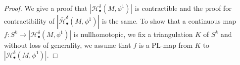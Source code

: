 \documentclass[a4paper]{amsart}
\theoremstyle{definition}
\theoremstyle{remark}
\numberwithin{equation}{section}
\begin{document}
\begin{proof}
We give a proof that $|\mathcal{H}_{\bullet}^{\delta}(M,\phi^1)|$ is  contractible and the proof for contractibility of $|\overline{\mathcal{H}}^{\delta}_{\bullet}(M,\phi^1)|$ is the same. To show that a continuous map $f:S^k\to |\mathcal{H}_{\bullet}^{\delta}(M,\phi^1)|$ is nullhomotopic, we fix a triangulation $K$ of $S^k$ and without loss of generality, we assume that $f$ is a PL-map from $K$ to  $|\mathcal{H}_{\bullet}^{\delta}(M,\phi^1)|$.
%


\end{proof}
\end{document}
